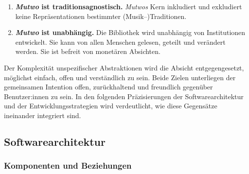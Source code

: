 \documentclass[12pt,a4paper,ngerman]{article}
\begin{document}
\begin{enumerate}
    \item{
            \textbf{ \emph{Mutwo} ist traditionsagnostisch. }
            \emph{Mutwos} Kern inkludiert und exkludiert keine Repräsentationen bestimmter (Musik--)Traditionen.
    }

    \item{
            \textbf{ \emph{Mutwo} ist unabhängig. }
            Die Bibliothek wird unabhängig von Institutionen entwickelt.
            Sie kann von allen Menschen gelesen, geteilt und verändert werden.
            Sie ist befreit von monetären Absichten.
    }

\end{enumerate}

Der Komplexität unspezifischer Abstraktionen wird die Absicht entgegengesetzt, möglichst einfach, offen und verständlich zu sein.
Beide Zielen unterliegen der gemeinsamen Intention offen, zurückhaltend und freundlich gegenüber Benutzer:innen zu sein.
In den folgenden Präzisierungen der Softwarearchitektur und der Entwicklungsstrategien wird verdeutlicht, wie diese Gegensätze ineinander integriert sind.








\subsection{Softwarearchitektur}

\subsubsection{Komponenten und Beziehungen}
\end{document}
